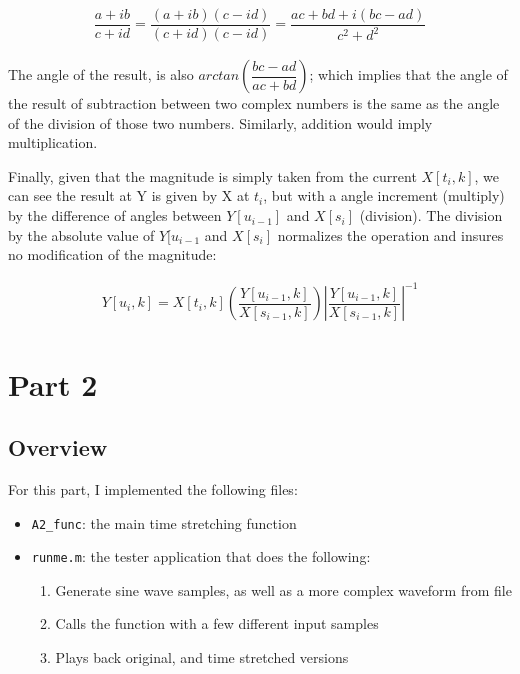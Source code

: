 \documentclass[12pt]{article}
\begin{document}
\begin{enumerate}
{\begin{align*}
\dfrac{a+ib}{c+id} = \dfrac{(a+ib)(c-id)}{(c+id)(c-id)} = \dfrac{ac+bd+i(bc-ad)}{c^2+d^2}
\end{align*}

The angle of the result, is also $arctan(\dfrac{bc-ad}{ac+bd})$; which implies that the angle of the result of subtraction between two complex numbers is the same as the angle of the division of those two numbers. Similarly, addition would imply multiplication.

Finally, given that the magnitude is simply taken from the current $X[t_i,k]$, we can see the result at Y is given by X at $t_i$, but with a angle increment (multiply) by the difference of angles between $Y[u_{i-1}]$ and $X[s_i]$ (division). The division by the absolute value of $Y[u_{i-1}$ and $X[s_i]$ normalizes the operation and insures no modification of the magnitude:

\begin{align*}
Y[u_i, k] = X [t_i,k]\left(\dfrac{Y[u_{i-1}, k]}{X[s_{i-1}, k]}\right)\left|\dfrac{Y[u_{i-1}, k]}{X[s_{i-1}, k]}\right|^{-1}
\end{align*}
}
\end{enumerate}

\newpage

\section*{Part 2}

\subsection*{Overview}
For this part, I implemented the following files:

\begin{itemize}
\item \verb|A2_func|: the main time stretching function
\item \verb|runme.m|: the tester application that does the following:
\begin{enumerate}
	\item 	Generate sine wave samples, as well as a more complex waveform from file
	\item   Calls the function with a few different input samples
	\item	Plays back original, and time stretched versions
\end{enumerate}
\end{itemize}
\end{document}
